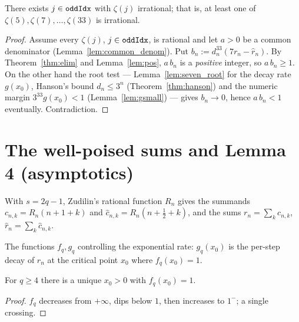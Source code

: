 \begin{theorem}
  \label{thm:main}
  \leanok
  There exists $j\in\texttt{oddIdx}$ with $\zeta(j)$ irrational; that is, at least
  one of $\zeta(5),\zeta(7),\dots,\zeta(33)$ is irrational.
\end{theorem}
\begin{proof}
  \leanok
  Assume every $\zeta(j)$, $j\in\texttt{oddIdx}$, is rational and let $a>0$ be a
  common denominator (Lemma~\ref{lem:common_denom}). Put
  $b_n:=d_n^{33}(7r_n-\hat r_n)$. By Theorem~\ref{thm:elim} and
  Lemma~\ref{lem:pos}, $a\,b_n$ is a \emph{positive} integer, so $a\,b_n\ge1$.
  On the other hand the root test — Lemma~\ref{lem:seven_root} for the decay
  rate $g(x_0)$, Hanson's bound $d_n\le3^n$ (Theorem~\ref{thm:hanson}) and the
  numeric margin $3^{33}g(x_0)<1$ (Lemma~\ref{lem:gsmall}) — gives $b_n\to0$,
  hence $a\,b_n<1$ eventually. Contradiction.
\end{proof}

\chapter{The well-poised sums and Lemma 4 (asymptotics)}

\begin{definition}
  \label{def:cr}
  \leanok
  With $s=2q-1$, Zudilin's rational function $R_n$ gives the summands
  $c_{n,k}=R_n(n+1+k)$ and $\hat c_{n,k}=R_n(n+\tfrac12+k)$, and the sums
  $r_n=\sum_{k}c_{n,k}$, $\hat r_n=\sum_{k}\hat c_{n,k}$.
\end{definition}

\begin{definition}
  \label{def:fg}
  \leanok
  The functions $f_q,g_q$ controlling the exponential rate: $g_q(x_0)$ is the
  per-step decay of $r_n$ at the critical point $x_0$ where $f_q(x_0)=1$.
\end{definition}

\begin{lemma}
  \label{lem:existsUnique_x0}
  \leanok
  For $q\ge4$ there is a unique $x_0>0$ with $f_q(x_0)=1$.
\end{lemma}
\begin{proof}\leanok{}
  $f_q$ decreases from $+\infty$, dips below $1$, then increases to $1^-$;
  a single crossing.
\end{proof}

